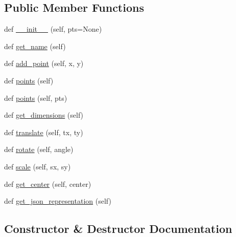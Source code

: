 \subsection*{Public Member Functions}
\begin{DoxyCompactItemize}
\item 
def \hyperlink{classbridges_1_1polyline_1_1_polyline_a536cf599bc221283c8e8d6df2324f23e}{\+\_\+\+\_\+init\+\_\+\+\_\+} (self, pts=None)
\item 
def \hyperlink{classbridges_1_1polyline_1_1_polyline_ac29d5a9cfe5fd60d97a32adef3a6b6bc}{get\+\_\+name} (self)
\item 
def \hyperlink{classbridges_1_1polyline_1_1_polyline_a0afbd2327d8dcba63809a6be07704753}{add\+\_\+point} (self, x, y)
\item 
def \hyperlink{classbridges_1_1polyline_1_1_polyline_ad1671a5857ad9e4010b7783b472c83fa}{points} (self)
\item 
def \hyperlink{classbridges_1_1polyline_1_1_polyline_ad543fcb38cb561b71d2ae2a9a88d9888}{points} (self, pts)
\item 
def \hyperlink{classbridges_1_1polyline_1_1_polyline_abc460c0169e1251e572642f8e968df05}{get\+\_\+dimensions} (self)
\item 
def \hyperlink{classbridges_1_1polyline_1_1_polyline_a654226c0de86aa0c6b9b5181a552cbfe}{translate} (self, tx, ty)
\item 
def \hyperlink{classbridges_1_1polyline_1_1_polyline_ab72d0a3cfdc4c3a7efec194f54f8a14a}{rotate} (self, angle)
\item 
def \hyperlink{classbridges_1_1polyline_1_1_polyline_a2727d3d6fa9da5ea738c51f822da16ae}{scale} (self, sx, sy)
\item 
def \hyperlink{classbridges_1_1polyline_1_1_polyline_a381cd78da11db3ce98fa87acd1d57449}{get\+\_\+center} (self, center)
\item 
def \hyperlink{classbridges_1_1polyline_1_1_polyline_a7f99e9e20c90068713b54ad64df3f193}{get\+\_\+json\+\_\+representation} (self)
\end{DoxyCompactItemize}


\subsection{Constructor \& Destructor Documentation}
\mbox{\label{classbridges_1_1polyline_1_1_polyline_a536cf599bc221283c8e8d6df2324f23e}} 

